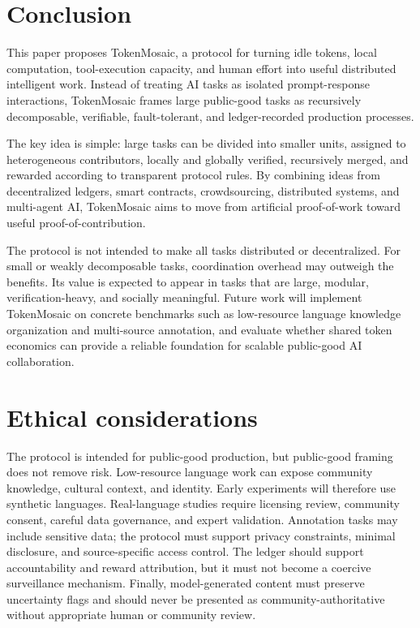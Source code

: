 \documentclass{article}
\theoremstyle{plain}
\begin{document}
\section{Conclusion}

This paper proposes TokenMosaic, a protocol for turning idle tokens, local computation, tool-execution capacity, and human effort into useful distributed intelligent work. Instead of treating AI tasks as isolated prompt-response interactions, TokenMosaic frames large public-good tasks as recursively decomposable, verifiable, fault-tolerant, and ledger-recorded production processes.

The key idea is simple: large tasks can be divided into smaller units, assigned to heterogeneous contributors, locally and globally verified, recursively merged, and rewarded according to transparent protocol rules. By combining ideas from decentralized ledgers, smart contracts, crowdsourcing, distributed systems, and multi-agent AI, TokenMosaic aims to move from artificial proof-of-work toward useful proof-of-contribution.

The protocol is not intended to make all tasks distributed or decentralized. For small or weakly decomposable tasks, coordination overhead may outweigh the benefits. Its value is expected to appear in tasks that are large, modular, verification-heavy, and socially meaningful. Future work will implement TokenMosaic on concrete benchmarks such as low-resource language knowledge organization and multi-source annotation, and evaluate whether shared token economics can provide a reliable foundation for scalable public-good AI collaboration.


\section*{Ethical considerations}

The protocol is intended for public-good production, but public-good framing does not remove risk. Low-resource language work can expose community knowledge, cultural context, and identity. Early experiments will therefore use synthetic languages. Real-language studies require licensing review, community consent, careful data governance, and expert validation. Annotation tasks may include sensitive data; the protocol must support privacy constraints, minimal disclosure, and source-specific access control. The ledger should support accountability and reward attribution, but it must not become a coercive surveillance mechanism. Finally, model-generated content must preserve uncertainty flags and should never be presented as community-authoritative without appropriate human or community review.
\end{document}
